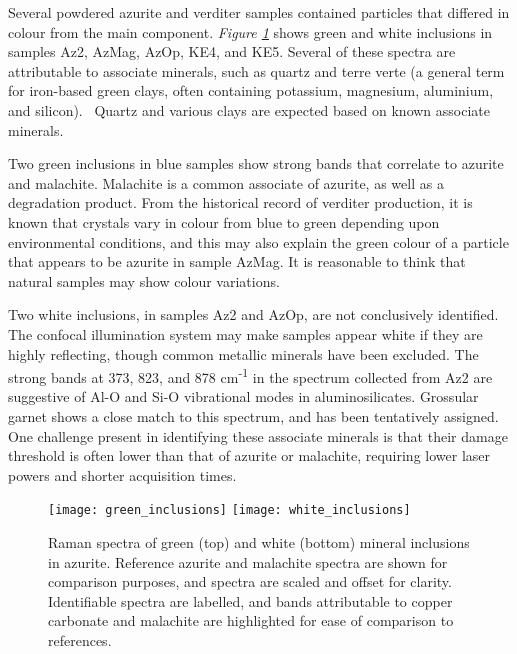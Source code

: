 Several powdered azurite and verditer samples contained particles that differed in colour from the main component. \textit{Figure \ref{fig:inclusion_raman}} shows green and white inclusions in samples Az2, AzMag, AzOp, KE4, and KE5. Several of these spectra are attributable to associate minerals, such as quartz and terre verte (a general term for iron-based green clays, often containing potassium, magnesium, aluminium, and silicon).~\autocite{ucl_database,cameo_mfa,irug_quartz} Quartz and various clays are expected based on known associate minerals.

Two green inclusions in blue samples show strong bands that correlate to azurite and malachite. Malachite is a common associate of azurite, as well as a degradation product. From the historical record of verditer production, it is known that crystals vary in colour from blue to green depending upon environmental conditions, and this may also explain the green colour of a particle that appears to be azurite in sample AzMag. It is reasonable to think that natural samples may show colour variations. 

Two white inclusions, in samples Az2 and AzOp, are not conclusively identified. The confocal illumination system may make samples appear white if they are highly reflecting, though common metallic minerals have been excluded. The strong bands at 373, 823, and 878 cm\textsuperscript{-1} in the spectrum collected from Az2 are suggestive of Al-O and Si-O vibrational modes in aluminosilicates. Grossular garnet shows a close match to this spectrum, and has been tentatively assigned.~\autocite{Culka} One challenge present in identifying these associate minerals is that their damage threshold is often lower than that of azurite or malachite, requiring lower laser powers and shorter acquisition times.

\begin{figure}[H]
\centering
\begin{minipage}[t]{\linewidth}
  \centering
  \texttt{[image: green\_inclusions]}
\hfill
\texttt{[image: white\_inclusions]}
\hfill
\end{minipage}
\caption[Raman spectra of green and white mineral inclusions in azurite.]{Raman spectra of green (top) and white (bottom) mineral inclusions in azurite. Reference azurite and malachite spectra are shown for comparison purposes, and spectra are scaled and offset for clarity. Identifiable spectra are labelled, and bands attributable to copper carbonate and malachite are highlighted for ease of comparison to references.}
\label{fig:inclusion_raman}
\end{figure}

